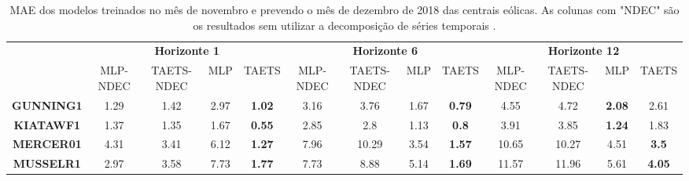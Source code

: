 \begin{table}
\caption{MAE dos modelos treinados no mês de novembro e prevendo o mês de dezembro de 2018 das centrais eólicas. As colunas com "NDEC" são os resultados sem utilizar a decomposição de séries temporais \cite{CABRAL}.}
\begin{tabular}{|l|l|l|l|l|l|l|l|l|l|l|l|l|}
\hline
\multicolumn{1}{|c|}{\textbf{}} & \multicolumn{4}{|c|}{\textbf{Horizonte 1}} & \multicolumn{4}{|c|}{\textbf{Horizonte 6}} & \multicolumn{4}{|c|}{\textbf{Horizonte 12}} \\
\cline{2-13} 
\multicolumn{1}{|c|}{\textbf{}} & \multicolumn{1}{|c|}{MLP-NDEC} & \multicolumn{1}{|c|}{TAETS-NDEC} & \multicolumn{1}{|c|}{MLP} & \multicolumn{1}{|c|}{TAETS} & \multicolumn{1}{|c|}{MLP-NDEC} & \multicolumn{1}{|c|}{TAETS-NDEC} & \multicolumn{1}{|c|}{MLP} & \multicolumn{1}{|c|}{TAETS} & \multicolumn{1}{|c|}{MLP-NDEC} & \multicolumn{1}{|c|}{TAETS-NDEC} & \multicolumn{1}{|c|}{MLP} & \multicolumn{1}{|c|}{TAETS} \\ \hline
\multicolumn{1}{|c|}{\textbf{GUNNING1}} & \multicolumn{1}{|c|}{1.29} & \multicolumn{1}{|c|}{1.42} & \multicolumn{1}{|c|}{2.97} & \multicolumn{1}{|c|}{\textbf{1.02}} & \multicolumn{1}{|c|}{3.16} & \multicolumn{1}{|c|}{3.76} & \multicolumn{1}{|c|}{1.67} & \multicolumn{1}{|c|}{\textbf{0.79}} & \multicolumn{1}{|c|}{4.55} & \multicolumn{1}{|c|}{4.72} & \multicolumn{1}{|c|}{\textbf{2.08}} & \multicolumn{1}{|c|}{2.61} \\ \hline
\multicolumn{1}{|c|}{\textbf{KIATAWF1}} & \multicolumn{1}{|c|}{1.37} & \multicolumn{1}{|c|}{1.35} & \multicolumn{1}{|c|}{1.67} & \multicolumn{1}{|c|}{\textbf{0.55}} & \multicolumn{1}{|c|}{2.85} & \multicolumn{1}{|c|}{2.8} & \multicolumn{1}{|c|}{1.13} & \multicolumn{1}{|c|}{\textbf{0.8}} & \multicolumn{1}{|c|}{3.91} & \multicolumn{1}{|c|}{3.85} & \multicolumn{1}{|c|}{\textbf{1.24}} & \multicolumn{1}{|c|}{1.83} \\ \hline
\multicolumn{1}{|c|}{\textbf{MERCER01}} & \multicolumn{1}{|c|}{4.31} & \multicolumn{1}{|c|}{3.41} & \multicolumn{1}{|c|}{6.12} & \multicolumn{1}{|c|}{\textbf{1.27}} & \multicolumn{1}{|c|}{7.96} & \multicolumn{1}{|c|}{10.29} & \multicolumn{1}{|c|}{3.54} & \multicolumn{1}{|c|}{\textbf{1.57}} & \multicolumn{1}{|c|}{10.65} & \multicolumn{1}{|c|}{10.27} & \multicolumn{1}{|c|}{4.51} & \multicolumn{1}{|c|}{\textbf{3.5}} \\ \hline
\multicolumn{1}{|c|}{\textbf{MUSSELR1}} & \multicolumn{1}{|c|}{2.97} & \multicolumn{1}{|c|}{3.58} & \multicolumn{1}{|c|}{7.73} & \multicolumn{1}{|c|}{\textbf{1.77}} & \multicolumn{1}{|c|}{7.73} & \multicolumn{1}{|c|}{8.88} & \multicolumn{1}{|c|}{5.14} & \multicolumn{1}{|c|}{\textbf{1.69}} & \multicolumn{1}{|c|}{11.57} & \multicolumn{1}{|c|}{11.96} & \multicolumn{1}{|c|}{5.61} & \multicolumn{1}{|c|}{\textbf{4.05}} \\ \hline

\end{tabular}
\end{table}
